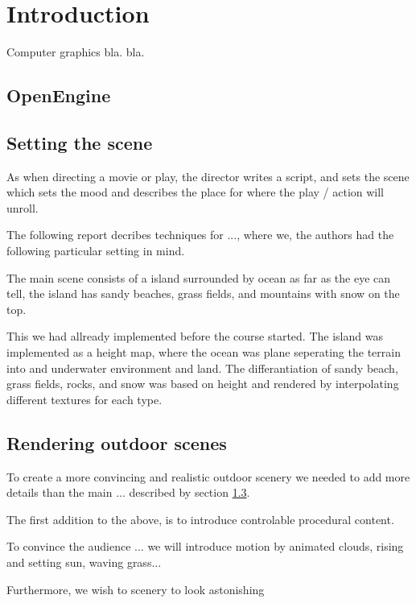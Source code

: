 
\chapter{Introduction}
Computer graphics bla. bla. 

\section{OpenEngine}



\section{Setting the scene}
As when directing a movie or play, the director writes a script, and
sets the scene which sets the mood and describes the place for where
the play / action will unroll.

The following report decribes techniques for ..., where we, the
authors had the following particular setting in mind.

The main scene consists of a island surrounded by ocean as far as the
eye can tell, the island has sandy beaches, grass fields, and mountains
with snow on the top.

This we had allready implemented before the course started. The island
was implemented as a height map, where the ocean was plane seperating
the terrain into and underwater environment and land. The
differantiation of sandy beach, grass fields, rocks, and snow was
based on height and rendered by interpolating different textures for
each type.

\section{Rendering outdoor scenes}
To create a more convincing and realistic outdoor scenery we needed to
add more details than the main ... described by section \ref{}.

The first addition to the above, is to introduce controlable
procedural content.

To convince the audience ... we will introduce motion by animated
clouds, rising and setting sun, waving grass...


Furthermore, we wish to scenery to look astonishing



